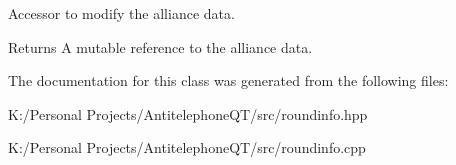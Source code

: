 Accessor to modify the alliance data. 

\begin{DoxyReturn}{Returns}
A mutable reference to the alliance data. 
\end{DoxyReturn}


The documentation for this class was generated from the following files\+:\begin{DoxyCompactItemize}
\item 
K\+:/\+Personal Projects/\+Antitelephone\+Q\+T/src/roundinfo.\+hpp\item 
K\+:/\+Personal Projects/\+Antitelephone\+Q\+T/src/roundinfo.\+cpp\end{DoxyCompactItemize}

